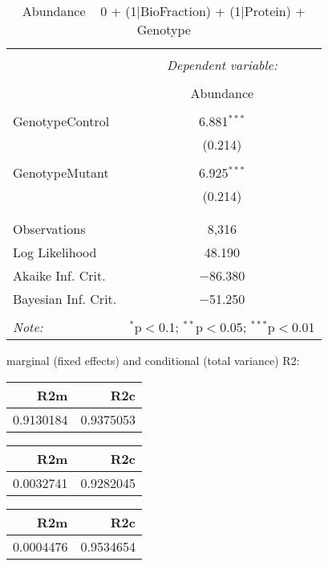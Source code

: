 \documentclass[11pt]{report}
\begin{document}
\begin{table}[!htbp] \centering 
  \caption{Abundance ~ 0 + (1|BioFraction) + (1|Protein) + Genotype} 
  \label{} 
\begin{tabular}{@{\extracolsep{5pt}}lc} 
\\[-1.8ex]\hline 
\hline \\[-1.8ex] 
 & \multicolumn{1}{c}{\textit{Dependent variable:}} \\ 
\cline{2-2} 
\\[-1.8ex] & Abundance \\ 
\hline \\[-1.8ex] 
 GenotypeControl & 6.881$^{***}$ \\ 
  & (0.214) \\ 
  & \\ 
 GenotypeMutant & 6.925$^{***}$ \\ 
  & (0.214) \\ 
  & \\ 
\hline \\[-1.8ex] 
Observations & 8,316 \\ 
Log Likelihood & 48.190 \\ 
Akaike Inf. Crit. & $-$86.380 \\ 
Bayesian Inf. Crit. & $-$51.250 \\ 
\hline 
\hline \\[-1.8ex] 
\textit{Note:}  & \multicolumn{1}{r}{$^{*}$p$<$0.1; $^{**}$p$<$0.05; $^{***}$p$<$0.01} \\ 
\end{tabular} 
\end{table} 
marginal (fixed effects) and conditional (total variance) R2:

\begin{tabular}{r|r}
\hline
R2m & R2c\\
\hline
0.9130184 & 0.9375053\\
\hline
\end{tabular}

\begin{tabular}{r|r}
\hline
R2m & R2c\\
\hline
0.0032741 & 0.9282045\\
\hline
\end{tabular}

\begin{tabular}{r|r}
\hline
R2m & R2c\\
\hline
0.0004476 & 0.9534654\\
\hline
\end{tabular}
\end{document}
